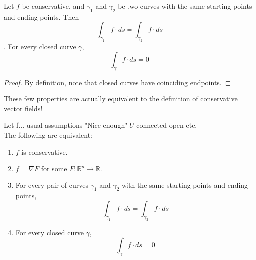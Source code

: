 \documentclass[11pt,openany]{book}
\newcommand{\proposition}[1]{\begin{tcolorbox}[title=Proposition,colframe=red!50!blue!20!white,colback=red!35!blue!10!white, coltitle=black]{#1}\end{tcolorbox}
}
\newcommand{\theorem}[2]{\begin{tcolorbox}[title=Theorem ({#1}),colframe=red!70!black,colback=red!5!white]{#2}\end{tcolorbox}
}
\begin{document}
	\proposition{
	Let $f$ be conservative, and $\gamma_1$ and $\gamma_2$ be two curves with the same starting points and ending points. Then \[
		\int_{\gamma_1} f \cdot ds = \int_{\gamma_2} f \cdot ds
	\].
	For every closed curve $\gamma$,
	\[
	\int_\gamma f\cdot ds = 0
	\]
	}
	
	\begin{proof}
		By definition, note that closed curves have coinciding endpoints.
	\end{proof}
	These few properties are actually equivalent to the definition of conservative vector fields!
	\theorem{Fundamental Theorem of Line Integrals}{
		Let f... usual assumptions "Nice enough" $U$ connected open etc.\\
		The following are equivalent:
		\begin{enumerate}
			\item $f$ is conservative.
			\item $f = \nabla F$ for some $F:\mathbb{R}^n \to \mathbb{R}$.
			\item For every pair of curves $\gamma_1$ and $\gamma_2$ with the same starting points and ending points, \[
			\int_{\gamma_1} f \cdot ds = \int_{\gamma_2} f \cdot ds
			\]
			\item For every closed curve $\gamma$,
			\[
			\int_\gamma f\cdot ds = 0
			\]
		\end{enumerate}
	}
\end{document}

